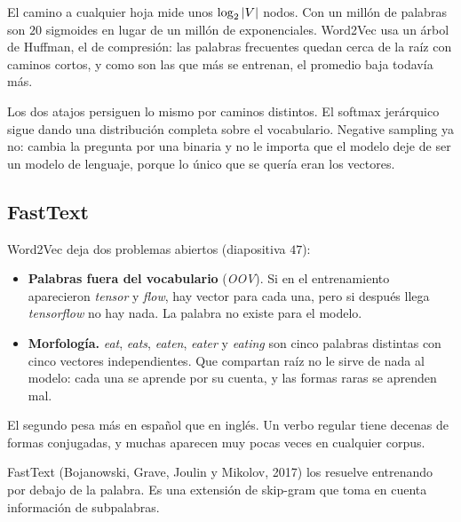 \documentclass[11pt,letterpaper]{article}
\begin{document}
\begin{idea}
    El camino a cualquier hoja mide unos $\log_2 \left\lvert V \right\rvert$ nodos. Con un
    millón de palabras son $20$ sigmoides en lugar de un millón de
    exponenciales. Word2Vec usa un árbol de Huffman, el de compresión:
    las palabras frecuentes quedan cerca de la raíz con caminos cortos,
    y como son las que más se entrenan, el promedio baja todavía más.
\end{idea}

\begin{ojo}
    Los dos atajos persiguen lo mismo por caminos distintos. El
    softmax jerárquico sigue dando una distribución completa sobre el
    vocabulario. Negative sampling ya no: cambia la pregunta por una
    binaria y no le importa que el modelo deje de ser un modelo de
    lenguaje, porque lo único que se quería eran los vectores.
\end{ojo}


\subsection*{FastText}

Word2Vec deja dos problemas abiertos (diapositiva $47$):

\begin{itemize}[itemsep=0.3em]
    \item \textbf{Palabras fuera del vocabulario} (\textit{OOV}). Si
          en el entrenamiento aparecieron \textit{tensor} y
          \textit{flow}, hay vector para cada una, pero si después
          llega \textit{tensorflow} no hay nada. La palabra no existe
          para el modelo.
    \item \textbf{Morfología.} \textit{eat}, \textit{eats},
          \textit{eaten}, \textit{eater} y \textit{eating} son cinco
          palabras distintas con cinco vectores independientes. Que
          compartan raíz no le sirve de nada al modelo: cada una se
          aprende por su cuenta, y las formas raras se aprenden mal.
\end{itemize}

El segundo pesa más en español que en inglés. Un verbo regular tiene
decenas de formas conjugadas, y muchas aparecen muy pocas veces en
cualquier corpus.

FastText (Bojanowski, Grave, Joulin y Mikolov, 2017) los resuelve
entrenando por debajo de la palabra. Es una extensión de skip-gram que
toma en cuenta información de subpalabras.
\end{document}
